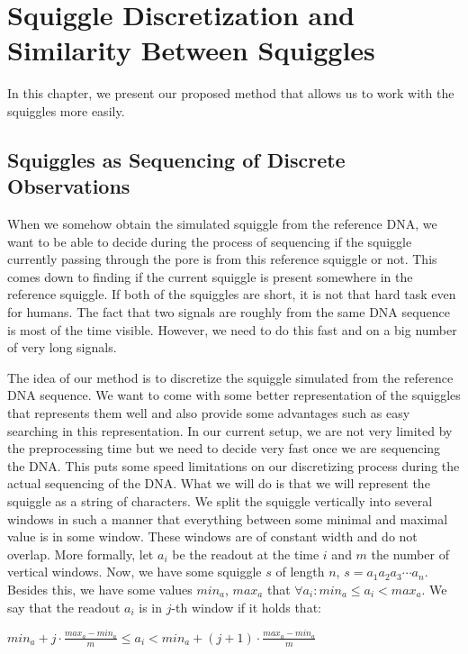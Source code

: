 \chapter{Squiggle Discretization and Similarity Between Squiggles}

\label{kap:proposedMethod}

In this chapter, we present our proposed method that allows us to work
with the squiggles more easily.

\section{Squiggles as Sequencing of Discrete Observations}

When we somehow obtain the simulated squiggle from the reference DNA, we want to be able
to decide during the process of sequencing if the squiggle currently passing
through the pore is from this reference squiggle or not. This comes down to finding if the
current squiggle is present somewhere in the reference squiggle. If both of the squiggles
are short, it is not that hard task even for humans. The fact that two signals are roughly
from the same DNA sequence is most of the time visible. However, we need to do
this fast and on a big number of very long signals.

The idea of our method is to discretize the squiggle simulated from the
reference DNA sequence. We want to come with some better representation of the
squiggles that represents them well and also provide some advantages such as
easy searching in this representation. In our current setup, we are
not very limited by the preprocessing time but we need to decide very fast once
we are sequencing the DNA. This puts some speed limitations on our discretizing
process during the actual sequencing of the DNA. What we will do is that we will
represent the squiggle as a string of characters. We split the squiggle vertically into several
windows in such a manner that everything between some minimal and maximal
value is in some window. These windows are of constant width and do not
overlap. More formally, let $a_i$ be the readout at the time $i$ and $m$ the number of
vertical windows. Now, we have some squiggle $s$ of length $n$, $s=a_1a_2a_3\cdots a_n$.
Besides this, we have some values $min_a$, $max_a$ that $\forall a_i: min_a \leq a_i < max_a$.
We say that the readout $a_i$ is in $j$-th window if it holds that:

\begin{center}
$min_a + j\cdot \frac{max_a-min_a}{m} \leq a_i < min_a + (j+1)\cdot \frac{max_a-min_a}{m}$
\end{center}


